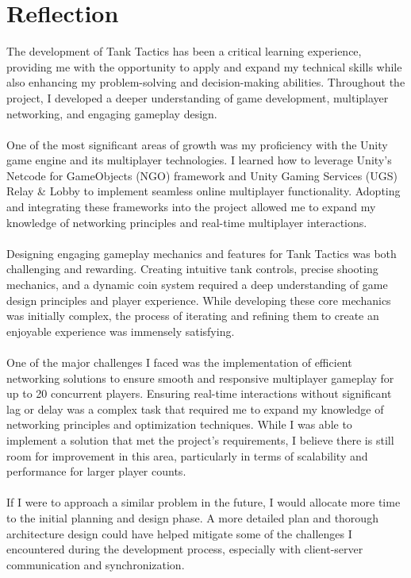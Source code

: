 \chapter{Reflection}
\label{ch:reflection}
The development of Tank Tactics has been a critical learning experience, providing me with the opportunity to apply and expand my technical skills while also enhancing my problem-solving and decision-making abilities. Throughout the project, I developed a deeper understanding of game development, multiplayer networking, and engaging gameplay design.
\\
\noindent
\\
One of the most significant areas of growth was my proficiency with the Unity game engine and its multiplayer technologies. I learned how to leverage Unity's Netcode for GameObjects (NGO) framework and Unity Gaming Services (UGS) Relay \& Lobby to implement seamless online multiplayer functionality. Adopting and integrating these frameworks into the project allowed me to expand my knowledge of networking principles and real-time multiplayer interactions.
\\
\noindent
\\
Designing engaging gameplay mechanics and features for Tank Tactics was both challenging and rewarding. Creating intuitive tank controls, precise shooting mechanics, and a dynamic coin system required a deep understanding of game design principles and player experience. While developing these core mechanics was initially complex, the process of iterating and refining them to create an enjoyable experience was immensely satisfying.
\\
\noindent
\\
One of the major challenges I faced was the implementation of efficient networking solutions to ensure smooth and responsive multiplayer gameplay for up to 20 concurrent players. Ensuring real-time interactions without significant lag or delay was a complex task that required me to expand my knowledge of networking principles and optimization techniques. While I was able to implement a solution that met the project's requirements, I believe there is still room for improvement in this area, particularly in terms of scalability and performance for larger player counts.
\\
\noindent
\\
If I were to approach a similar problem in the future, I would allocate more time to the initial planning and design phase. A more detailed plan and thorough architecture design could have helped mitigate some of the challenges I encountered during the development process, especially with client-server communication and synchronization.
